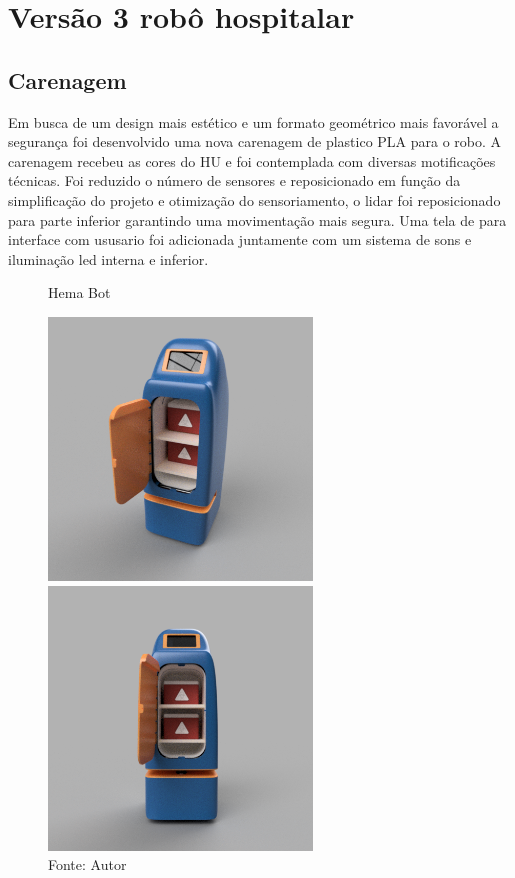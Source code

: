 \documentclass[../poliXuniversity_hospital_(USP)_report.tex]{subfiles}
\begin{document}
\chapter{Versão 3 robô hospitalar}

\section{Carenagem}
Em busca de um design mais estético e um formato geométrico mais favorável a segurança foi desenvolvido uma nova carenagem de plastico PLA para o robo. A carenagem recebeu as cores do HU e foi contemplada com diversas motificações técnicas. Foi reduzido o número de sensores e reposicionado em função da simplificação do projeto e otimização do sensoriamento, o lidar foi reposicionado para parte inferior garantindo uma movimentação mais segura. Uma tela de para interface com ususario foi adicionada juntamente com um sistema de sons e iluminação led interna e inferior.

\begin{figure}[h]
\centering

    \caption{Hema Bot}
    \begin{minipage}{0.5\textwidth}
        \centering
        \centering %
        \includegraphics[width=7cm]{images/V3_aberta_angulada.png}
    \end{minipage}\hfill
    \begin{minipage}{0.5\textwidth}
        \centering
        \centering %
        \includegraphics[width=7cm]{images/V3_aberta_frontal.png}

    \end{minipage}\hfill
    \caption*{Fonte: Autor}
    \label{figura: Sistema Golgi}
        
\end{figure}
\end{document}
